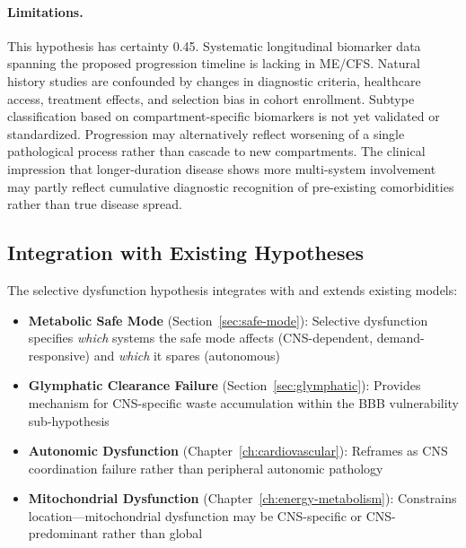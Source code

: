 \begin{hypothesis}
\paragraph{Limitations.}
This hypothesis has certainty 0.45\@. Systematic longitudinal biomarker data spanning the proposed progression timeline is lacking in ME/CFS. Natural history studies are confounded by changes in diagnostic criteria, healthcare access, treatment effects, and selection bias in cohort enrollment. Subtype classification based on compartment-specific biomarkers is not yet validated or standardized. Progression may alternatively reflect worsening of a single pathological process rather than cascade to new compartments. The clinical impression that longer-duration disease shows more multi-system involvement~\cite{Jason2019onset} may partly reflect cumulative diagnostic recognition of pre-existing comorbidities rather than true disease spread.
\end{hypothesis}


\subsection{Integration with Existing Hypotheses}

The selective dysfunction hypothesis integrates with and extends existing models:

\begin{itemize}
    \item \textbf{Metabolic Safe Mode} (Section~\ref{sec:safe-mode}): Selective dysfunction specifies \emph{which} systems the safe mode affects (CNS-dependent, demand-responsive) and \emph{which} it spares (autonomous)

    \item \textbf{Glymphatic Clearance Failure} (Section~\ref{sec:glymphatic}): Provides mechanism for CNS-specific waste accumulation within the BBB vulnerability sub-hypothesis

    \item \textbf{Autonomic Dysfunction} (Chapter~\ref{ch:cardiovascular}): Reframes as CNS coordination failure rather than peripheral autonomic pathology

    \item \textbf{Mitochondrial Dysfunction} (Chapter~\ref{ch:energy-metabolism}): Constrains location---mitochondrial dysfunction may be CNS-specific or CNS-predominant rather than global
\end{itemize}

